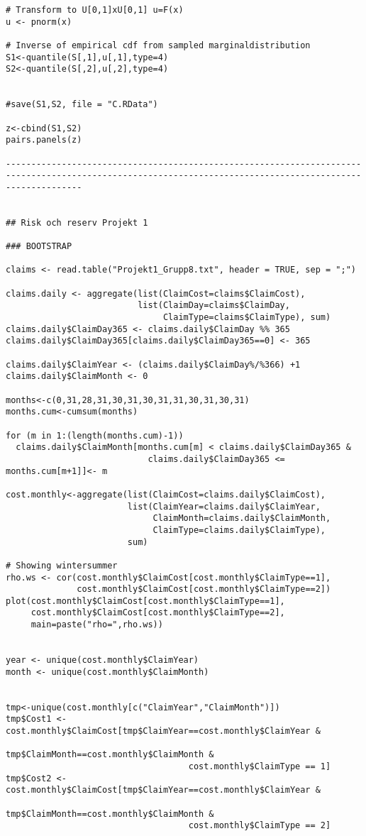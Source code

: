 \documentclass[11pt]{article}
\begin{document}
\begin{verbatim}
# Transform to U[0,1]xU[0,1] u=F(x)
u <- pnorm(x)

# Inverse of empirical cdf from sampled marginaldistribution 
S1<-quantile(S[,1],u[,1],type=4)
S2<-quantile(S[,2],u[,2],type=4)


#save(S1,S2, file = "C.RData")

z<-cbind(S1,S2)
pairs.panels(z)

-----------------------------------------------------------------------------------------------------------------------------------------------------------


## Risk och reserv Projekt 1

### BOOTSTRAP

claims <- read.table("Projekt1_Grupp8.txt", header = TRUE, sep = ";")

claims.daily <- aggregate(list(ClaimCost=claims$ClaimCost),
                          list(ClaimDay=claims$ClaimDay,
                               ClaimType=claims$ClaimType), sum)
claims.daily$ClaimDay365 <- claims.daily$ClaimDay %% 365
claims.daily$ClaimDay365[claims.daily$ClaimDay365==0] <- 365

claims.daily$ClaimYear <- (claims.daily$ClaimDay%/%366) +1
claims.daily$ClaimMonth <- 0

months<-c(0,31,28,31,30,31,30,31,31,30,31,30,31)
months.cum<-cumsum(months)

for (m in 1:(length(months.cum)-1))
  claims.daily$ClaimMonth[months.cum[m] < claims.daily$ClaimDay365 &
                            claims.daily$ClaimDay365 <= months.cum[m+1]]<- m

cost.monthly<-aggregate(list(ClaimCost=claims.daily$ClaimCost),
                        list(ClaimYear=claims.daily$ClaimYear,
                             ClaimMonth=claims.daily$ClaimMonth,
                             ClaimType=claims.daily$ClaimType),
                        sum)

# Showing wintersummer
rho.ws <- cor(cost.monthly$ClaimCost[cost.monthly$ClaimType==1],
              cost.monthly$ClaimCost[cost.monthly$ClaimType==2])
plot(cost.monthly$ClaimCost[cost.monthly$ClaimType==1],
     cost.monthly$ClaimCost[cost.monthly$ClaimType==2],
     main=paste("rho=",rho.ws))


year <- unique(cost.monthly$ClaimYear)
month <- unique(cost.monthly$ClaimMonth)


tmp<-unique(cost.monthly[c("ClaimYear","ClaimMonth")])
tmp$Cost1 <- cost.monthly$ClaimCost[tmp$ClaimYear==cost.monthly$ClaimYear &
                                    tmp$ClaimMonth==cost.monthly$ClaimMonth &
                                    cost.monthly$ClaimType == 1]
tmp$Cost2 <- cost.monthly$ClaimCost[tmp$ClaimYear==cost.monthly$ClaimYear &
                                    tmp$ClaimMonth==cost.monthly$ClaimMonth &
                                    cost.monthly$ClaimType == 2]


\end{verbatim}
\end{document}
